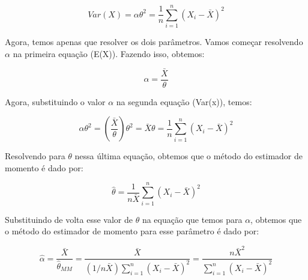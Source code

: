 \begin{equation}
	Var(X)=\alpha\theta^2=\dfrac{1}{n}\sum\limits_{i=1}^n (X_i-\bar{X})^2
\end{equation}

Agora, temos apenas que resolver os dois parâmetros. Vamos  começar resolvendo \begin{math} \alpha \end{math} na primeira equação (E(X)). Fazendo isso, obtemos:


\begin{equation}
	\alpha=\dfrac{\bar{X}}{\theta}
\end{equation}

Agora, substituindo o valor \begin{math} \alpha \end{math} na segunda equação (Var(x)), temos:

\begin{equation}
\alpha\theta^2=\left(\dfrac{\bar{X}}{\theta}\right)\theta^2=\bar{X}\theta=\dfrac{1}{n}\sum\limits_{i=1}^n (X_i-\bar{X})^2
\end{equation}

Resolvendo para \begin{math} \theta \end{math} nessa última equação, obtemos que o método do estimador de momento é dado por: 

\begin{equation}
\hat{\theta}=\dfrac{1}{n\bar{X}}\sum\limits_{i=1}^n (X_i-\bar{X})^2
\end{equation}

Substituindo de volta esse valor de  \begin{math} \theta \end{math} na equação que temos para \begin{math} \alpha \end{math}, obtemos que o método do estimador de momento para esse parâmetro é dado por:

\begin{equation}
\hat{\alpha}=\dfrac{\bar{X}}{\hat{\theta}_{MM}}=\dfrac{\bar{X}}{(1/n\bar{X})\sum\limits_{i=1}^n (X_i-\bar{X})^2}=\dfrac{n\bar{X}^2}{\sum\limits_{i=1}^n (X_i-\bar{X})^2}
\end{equation}











